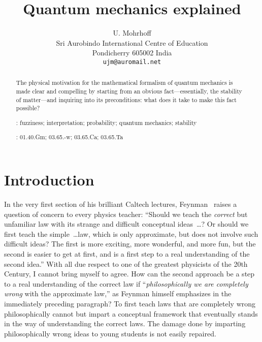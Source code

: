 \documentclass[12pt]{article}
\begin{document}
\setlength{\baselineskip}{16.5pt}
\title{Quantum mechanics explained}
\author{U. Mohrhoff\\
Sri Aurobindo International Centre of Education\\
Pondicherry 605002 India\\
\normalsize\tt ujm@auromail.net}
\date{}
\maketitle
\begin{abstract}
\noindent The physical motivation for the mathematical formalism of quantum mechanics is made clear and compelling by starting from an obvious fact---essentially, the stability of matter---and inquiring into its preconditions: what does it take to make this fact possible?

\vspace{6pt}: fuzziness; interpretation; probability; quantum mechanics; stability

\vspace{6pt}: 01.40.Gm; 03.65.-w; 03.65.Ca; 03.65.Ta
\setlength{\baselineskip}{14pt}
\end{abstract}
\pagebreak
\section{Introduction}
In the very first section of his brilliant Caltech lectures, Feynman~\cite{Feynmanteach}  raises a question of concern to every physics teacher: ``Should we teach the {\it correct\/} but unfamiliar law with its strange and difficult conceptual ideas~\dots? Or should we first teach the simple~\dots law, which is only approximate, but does not involve such difficult ideas? The first is more exciting, more wonderful, and more fun, but the second is easier to get at first, and is a first step to a real understanding of the second idea.'' With all due respect to one of the greatest physicists of the 20th Century, I cannot bring myself to agree. How can the second approach be a step to a real understanding of the correct law if ``{\it philosophically we are completely wrong\/} with the approximate law,'' as Feynman himself emphasizes in the immediately preceding paragraph? To first teach laws that are completely wrong philosophically cannot but impart a conceptual framework that eventually stands in the way of understanding the correct laws. The damage done by imparting philosophically wrong ideas to young students is not easily repaired. 
\end{document}
